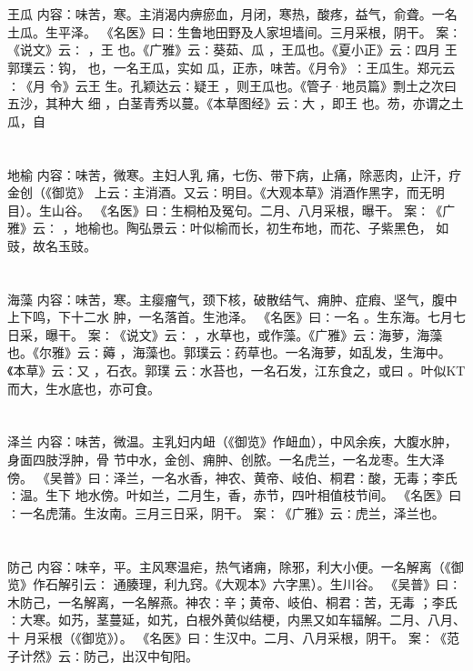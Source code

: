 \documentclass[12pt,UTF8]{ctexbook}
\begin{document}
\section{}王瓜
内容：味苦，寒。主消渴内痹瘀血，月闭，寒热，酸疼，益气，俞聋。一名土瓜。生平泽。 
《名医》曰∶生鲁地田野及人家坦墙间。三月采根，阴干。 
案∶《说文》云∶ ，王 也。《广雅》云∶葵茹、瓜 ，王瓜也。《夏小正》云∶四月 
王 
郭璞云∶钩， 也，一名王瓜，实如 瓜，正赤，味苦。《月令》∶王瓜生。郑元云∶《月 
令》云王 生。孔颖达云∶疑王 ，则王瓜也。《管子·地员篇》剽土之次曰五沙，其种大 
细 ，白茎青秀以蔓。《本草图经》云∶大 ，即王 也。芴，亦谓之土瓜，自 


\section{}地榆
内容：味苦，微寒。主妇人乳 痛，七伤、带下病，止痛，除恶肉，止汗，疗金创（《御览》 
上云∶主消酒。又云∶明目。《大观本草》消酒作黑字，而无明目）。生山谷。 
《名医》曰∶生桐柏及冤句。二月、八月采根，曝干。 
案∶《广雅》云∶ ，地榆也。陶弘景云∶叶似榆而长，初生布地，而花、子紫黑色， 
如豉，故名玉豉。 


\section{}海藻
内容：味苦，寒。主瘿瘤气，颈下核，破散结气、痈肿、症瘕、坚气，腹中上下鸣，下十二水 
肿，一名落首。生池泽。 
《名医》曰∶一名 。生东海。七月七日采，曝干。 
案∶《说文》云∶ ，水草也，或作藻。《广雅》云∶海萝，海藻也。《尔雅》云∶薅 
，海藻也。郭璞云∶药草也。一名海萝，如乱发，生海中。《本草》云∶又 ，石衣。郭璞 
云∶水苔也，一名石发，江东食之，或曰 。叶似KT 而大，生水底也，亦可食。 


\section{}泽兰
内容：味苦，微温。主乳妇内衄（《御览》作衄血），中风余疾，大腹水肿，身面四肢浮肿，骨 
节中水，金创、痈肿、创脓。一名虎兰，一名龙枣。生大泽傍。 
《吴普》曰∶泽兰，一名水香，神农、黄帝、岐伯、桐君∶酸，无毒；李氏∶温。生下 
地水傍。叶如兰，二月生，香，赤节，四叶相值枝节间。 
《名医》曰∶一名虎蒲。生汝南。三月三日采，阴干。 
案∶《广雅》云∶虎兰，泽兰也。 


\section{}防己
内容：味辛，平。主风寒温疟，热气诸痈，除邪，利大小便。一名解离（《御览》作石解引云∶ 
通腠理，利九窍。《大观本》六字黑）。生川谷。 
《吴普》曰∶木防己，一名解离，一名解燕。神农∶辛；黄帝、岐伯、桐君∶苦，无毒 
；李氏∶大寒。如艿，茎蔓延，如艽，白根外黄似结梗，内黑又如车辐解。二月、八月、十 
月采根（《御览》）。 
《名医》曰∶生汉中。二月、八月采根，阴干。 
案∶《范子计然》云∶防己，出汉中旬阳。 
\end{document}
